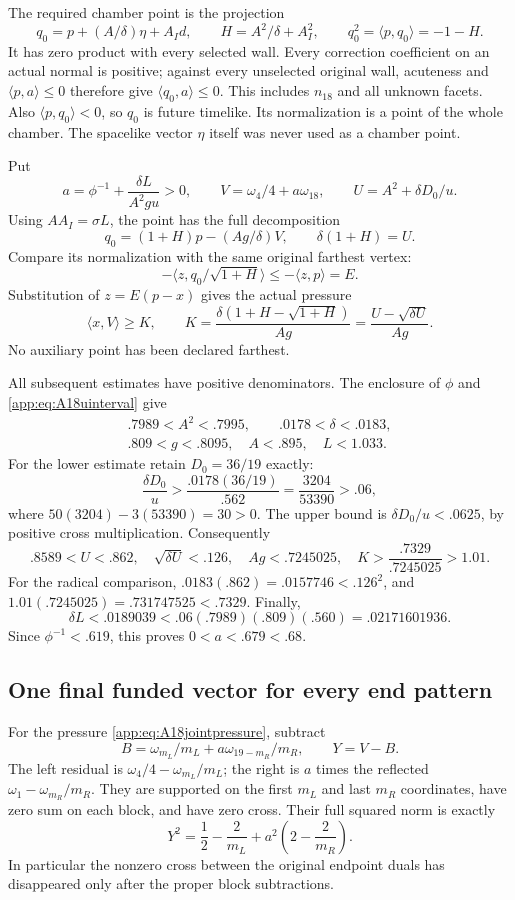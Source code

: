 \documentclass[11pt]{article}
\theoremstyle{definition}
\theoremstyle{remark}
\newcommand{\ip}[2]{\langle #1,#2\rangle}
\begin{document}
The required chamber point is the projection
\[
 q_0=p+(A/\delta)\eta+A_Id,\qquad
 H=A^2/\delta+A_I^2,\qquad
 q_0^2=\ip p{q_0}=-1-H .
\]
It has zero product with every selected wall. Every correction
coefficient on an actual normal is positive; against every
unselected original wall, acuteness and \(\ip p a\leq0\)
therefore give \(\ip{q_0}a\leq0\). This includes \(n_{18}\)
and all unknown facets. Also \(\ip p{q_0}<0\), so \(q_0\) is
future timelike. Its normalization is a point of the whole
chamber. The spacelike vector \(\eta\) itself was never used
as a chamber point.

Put
\[
 a=\phi^{-1}+\frac{\delta L}{A^2gu}>0,\qquad
 V=\omega_4/4+a\omega_{18},\qquad
 U=A^2+\delta D_0/u .
\]
Using \(AA_I=\sigma L\), the point has the full decomposition
\[
 q_0=(1+H)p-(Ag/\delta)V,\qquad
 \delta(1+H)=U.
\]
Compare its normalization with the same original farthest vertex:
\[
 -\ip z{q_0/\sqrt{1+H}}\leq-\ip zp=E .
\]
Substitution of \(z=E(p-x)\) gives the actual pressure
\begin{equation}\label{app:eq:A18jointpressure}
 \ip xV\geq K,\qquad
 K=\frac{\delta(1+H-\sqrt{1+H})}{Ag}
   =\frac{U-\sqrt{\delta U}}{Ag}.
\end{equation}
No auxiliary point has been declared farthest.

All subsequent estimates have positive denominators. The enclosure
of \(\phi\) and \eqref{app:eq:A18uinterval} give
\[
\begin{gathered}
 .7989<A^2<.7995,\qquad .0178<\delta<.0183,\\
 .809<g<.8095,\quad A<.895,\quad L<1.033 .
\end{gathered}
\]
For the lower estimate retain \(D_0=36/19\) exactly:
\[
 \frac{\delta D_0}{u}
  >\frac{.0178(36/19)}{.562}
   =\frac{3204}{53390}>.06 ,
\]
where \(50(3204)-3(53390)=30>0\).
The upper bound is \(\delta D_0/u<.0625\), by positive
cross multiplication. Consequently
\[
 .8589<U<.862,\quad
 \sqrt{\delta U}<.126,\quad
 Ag<.7245025,\quad
 K>\frac{.7329}{.7245025}>1.01 .
\]
For the radical comparison,
\(.0183(.862)=.0157746<.126^2\), and
\(1.01(.7245025)=.731747525<.7329\).
Finally,
\[
 \delta L<.0189039
 <.06(.7989)(.809)(.560)=.02171601936 .
\]
Since \(\phi^{-1}<.619\), this proves \(0<a<.679<.68\).

\subsection{One final funded vector for every end pattern}
\label{app:A18lastpayment}
For the pressure \eqref{app:eq:A18jointpressure}, subtract
\[
 B=\omega_{m_L}/m_L+a\omega_{19-m_R}/m_R,\qquad Y=V-B.
\]
The left residual is \(\omega_4/4-\omega_{m_L}/m_L\);
the right is \(a\) times the reflected
\(\omega_1-\omega_{m_R}/m_R\).
They are supported on the first \(m_L\) and last \(m_R\)
coordinates, have zero sum on each block, and have zero cross.
Their full squared norm is exactly
\[
 Y^2=\frac12-\frac2{m_L}
          +a^2\left(2-\frac2{m_R}\right).
\]
In particular the nonzero cross between the original endpoint
duals has disappeared only after the proper block subtractions.
\end{document}
